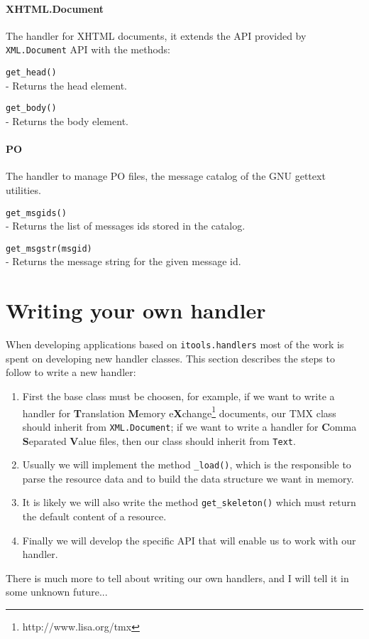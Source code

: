 \paragraph{XHTML.Document}

The handler for XHTML documents, it extends the API provided by
{\tt XML.Document} API with the methods:

\begin{api}
  {\tt get\_head()}\\
  - Returns the head element.

  {\tt get\_body()}\\
  - Returns the body element.
\end{api}

\paragraph{PO}

The handler to manage PO files, the message catalog of the GNU gettext
utilities.

\begin{api}
  {\tt get\_msgids()}\\
  - Returns the list of messages ids stored in the catalog.

  {\tt get\_msgstr(msgid)}\\
  - Returns the message string for the given message id.
\end{api}



\section{Writing your own handler}

When developing applications based on {\tt itools.handlers} most of the
work is spent on developing new handler classes. This section describes
the steps to follow to write a new handler:

\begin{enumerate}
  \item First the base class must be choosen, for example, if we want
    to write a handler for {\bf T}ranslation {\bf M}emory
    e{\bf X}change\footnote{http://www.lisa.org/tmx} documents, our TMX
    class should inherit from {\tt XML.Document}; if we want to write
    a handler for {\bf C}omma {\bf S}eparated {\bf V}alue files, then our
    class should inherit from {\tt Text}.

  \item Usually we will implement the method {\tt \_load()}, which is the
    responsible to parse the resource data and to build the data structure
    we want in memory.

  \item It is likely we will also write the method {\tt get\_skeleton()}
    which must return the default content of a resource.

  \item Finally we will develop the specific API that will enable us to
    work with our handler.
\end{enumerate}


There is much more to tell about writing our own handlers, and I will tell
it in some unknown future...
